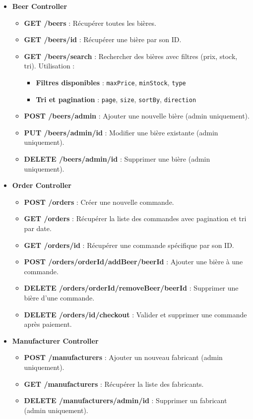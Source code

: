 \documentclass{article}
\begin{document}
\begin{itemize}
    \item \textbf{Beer Controller}
        \begin{itemize}
            \item \textbf{GET /beers} : Récupérer toutes les bières.
            \item \textbf{GET /beers/{id}} : Récupérer une bière par son ID.
            \item \textbf{GET /beers/search} : Rechercher des bières avec filtres (prix, stock, tri). Utilisation :
                  \begin{itemize}
                      \item \textbf{Filtres disponibles} : \texttt{maxPrice}, \texttt{minStock}, \texttt{type}
                      \item \textbf{Tri et pagination} : \texttt{page}, \texttt{size}, \texttt{sortBy}, \texttt{direction}
                  \end{itemize}
            \item \textbf{POST /beers/admin} : Ajouter une nouvelle bière (admin uniquement).
            \item \textbf{PUT /beers/admin/{id}} : Modifier une bière existante (admin uniquement).
            \item \textbf{DELETE /beers/admin/{id}} : Supprimer une bière (admin uniquement).
        \end{itemize}
    \item \textbf{Order Controller}
        \begin{itemize}
            \item \textbf{POST /orders} : Créer une nouvelle commande.
            \item \textbf{GET /orders} : Récupérer la liste des commandes avec pagination et tri par date.
            \item \textbf{GET /orders/{id}} : Récupérer une commande spécifique par son ID.
            \item \textbf{POST /orders/{orderId}/addBeer/{beerId}} : Ajouter une bière à une commande.
            \item \textbf{DELETE /orders/{orderId}/removeBeer/{beerId}} : Supprimer une bière d'une commande.
            \item \textbf{DELETE /orders/{id}/checkout} : Valider et supprimer une commande après paiement.
        \end{itemize}
    \item \textbf{Manufacturer Controller}
        \begin{itemize}
            \item \textbf{POST /manufacturers} : Ajouter un nouveau fabricant (admin uniquement).
            \item \textbf{GET /manufacturers} : Récupérer la liste des fabricants.
            \item \textbf{DELETE /manufacturers/admin/{id}} : Supprimer un fabricant (admin uniquement).
        \end{itemize}
\end{itemize}
\end{document}
